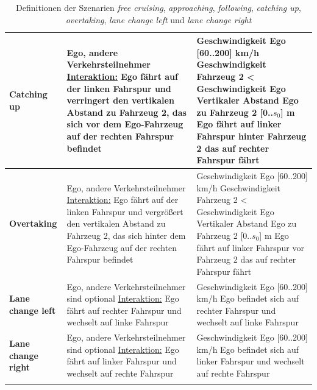 \begin{longtable}[c]{p{2.5cm} p{5.5cm} p{5.5cm}}
\textbf{Catching up} & Ego, andere Verkehrsteilnehmer \newline \underline{Interaktion:} Ego fährt auf der linken Fahrspur und verringert den vertikalen Abstand zu Fahrzeug 2, das sich vor dem Ego-Fahrzeug auf der rechten Fahrspur befindet & Geschwindigkeit Ego [60..200] km/h \newline Geschwindigkeit Fahrzeug 2 < Geschwindigkeit Ego \newline Vertikaler Abstand Ego zu Fahrzeug 2 [0..$s_0$] m \newline Ego fährt auf linker Fahrspur hinter Fahrzeug 2 das auf rechter Fahrspur fährt \\
\hline

\textbf{Overtaking} & Ego, andere Verkehrsteilnehmer \newline \underline{Interaktion:} Ego fährt auf der linken Fahrspur und vergrößert den vertikalen Abstand zu Fahrzeug 2, das sich hinter dem Ego-Fahrzeug auf der rechten Fahrspur befindet & Geschwindigkeit Ego [60..200] km/h \newline Geschwindigkeit Fahrzeug 2 < Geschwindigkeit Ego \newline Vertikaler Abstand Ego zu Fahrzeug 2 [0..$s_0$] m \newline Ego fährt auf linker Fahrspur vor Fahrzeug 2 das auf rechter Fahrspur fährt \\
\hline

\textbf{Lane change left} & Ego, andere Verkehrsteilnehmer sind optional \newline \underline{Interaktion:} Ego fährt auf rechter Fahrspur und wechselt auf linke Fahrspur & Geschwindigkeit Ego [60..200] km/h \newline Ego befindet sich auf rechter Fahrspur und wechselt auf linke Fahrspur \\
\hline

\textbf{Lane change right} & Ego, andere Verkehrsteilnehmer sind optional \newline \underline{Interaktion:} Ego fährt auf linker Fahrspur und wechselt auf rechte Fahrspur & Geschwindigkeit Ego [60..200] km/h \newline Ego befindet sich auf linker Fahrspur und wechselt auf rechte Fahrspur \\
\hline

\caption{Definitionen der Szenarien \textit{free cruising}, \textit{approaching}, \textit{following}, \textit{catching up}, \textit{overtaking}, \textit{lane change left} und \textit{lane change right}}
\label{tab_definition_szenarios}
\end{longtable}

